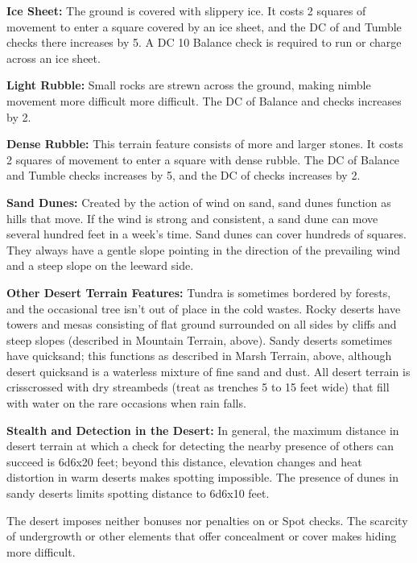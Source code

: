 \textbf{Ice Sheet:} The ground is covered with slippery ice. It costs 2 squares 
of movement to enter a square covered by an ice sheet, and the DC of  and 
Tumble checks there increases by 5. A DC 10 Balance check is required to run or 
charge across an ice sheet. 

\textbf{Light Rubble:} Small rocks are strewn across the ground, making nimble 
movement more difficult more difficult. The DC of Balance and  checks increases 
by 2. 

\textbf{Dense Rubble:} This terrain feature consists of more and larger stones. 
It costs 2 squares of movement to enter a square with dense rubble. The DC of Balance 
and Tumble checks increases by 5, and the DC of  checks increases 
by 2.

\textbf{Sand Dunes:} Created by the action of wind on sand, sand dunes function 
as hills that move. If the wind is strong and consistent, a sand dune can move 
several hundred feet in a week's time. Sand dunes can cover hundreds of squares. 
They always have a gentle slope pointing in the direction of the prevailing wind 
and a steep slope on the leeward side.

\textbf{Other Desert Terrain Features:} Tundra is sometimes bordered by forests, 
and the occasional tree isn't out of place in the cold wastes. Rocky deserts have 
towers and mesas consisting of flat ground surrounded on all sides by cliffs and 
steep slopes (described in Mountain Terrain, above). Sandy deserts sometimes have 
quicksand; this functions as described in Marsh Terrain, above, although desert 
quicksand is a waterless mixture of fine sand and dust. All desert terrain is crisscrossed 
with dry streambeds (treat as trenches 5 to 15 feet wide) that fill with water 
on the rare occasions when rain falls.

\textbf{Stealth and Detection in the Desert:} In general, the maximum distance 
in desert terrain at which a  check for detecting the nearby presence of others 
can succeed is 6d6x20 feet; beyond this distance, elevation changes 
and heat distortion in warm deserts makes spotting impossible. The presence of 
dunes in sandy deserts limits spotting distance to 6d6x10 feet. 

The desert imposes neither bonuses nor penalties on  or Spot checks. The 
scarcity of undergrowth or other elements that offer concealment or cover makes 
hiding more difficult.

